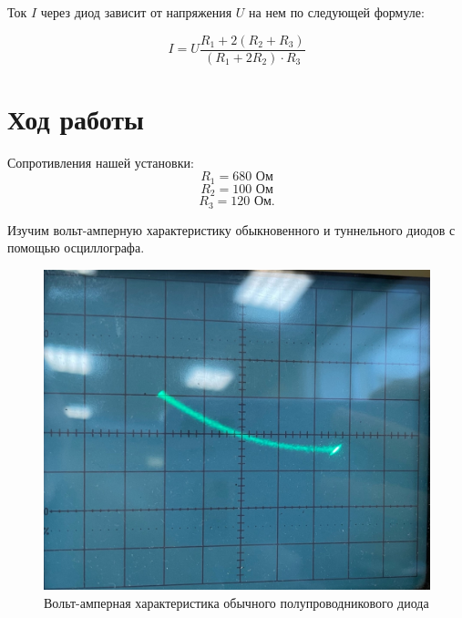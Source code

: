 \documentclass[a4paper,12pt]{article} %
\begin{document}
	Ток $I$ через диод зависит от напряжения $U$ на нем по следующей формуле: 
	
	\[ I = U \frac{R_1 + 2(R_2 + R_3)}{(R_1 + 2R_2) \cdot R_3} \]
	

\section{Ход работы}

Сопротивления нашей установки:
$$R_1 = 680 \text{ Ом}$$
$$R_2 = 100 \text{ Ом}$$
$$R_3 = 120 \text{ Ом}.$$


Изучим вольт-амперную характеристику обыкновенного и туннельного диодов с помощью осциллографа.

\begin{figure}[h!]
    

\begin{minipage}{0.45\textwidth}
  \includegraphics[width= \linewidth]{ваха_обычный.jpg}
  \caption{Вольт-амперная характеристика обычного полупроводникового диода}
  \label{fig:mirrored_polarization_degree_by_theta}

\end{minipage}
\hfill%
\begin{minipage}{0.45\textwidth}
 

\end{minipage}
\end{figure}
\end{document}
